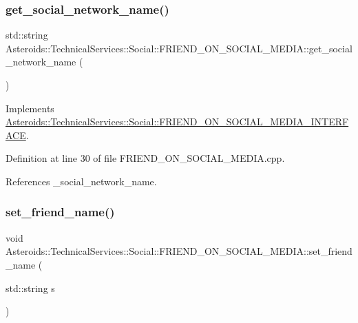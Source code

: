 \subsubsection{\texorpdfstring{get\+\_\+social\+\_\+network\+\_\+name()}{get\_social\_network\_name()}}
{\footnotesize\ttfamily std\+::string Asteroids\+::\+Technical\+Services\+::\+Social\+::\+F\+R\+I\+E\+N\+D\+\_\+\+O\+N\+\_\+\+S\+O\+C\+I\+A\+L\+\_\+\+M\+E\+D\+I\+A\+::get\+\_\+social\+\_\+network\+\_\+name (\begin{DoxyParamCaption}{ }\end{DoxyParamCaption})\hspace{0.3cm}{\ttfamily [virtual]}}



Implements \hyperlink{classAsteroids_1_1TechnicalServices_1_1Social_1_1FRIEND__ON__SOCIAL__MEDIA__INTERFACE_a695c43020081a6ca5d4537762b63006b}{Asteroids\+::\+Technical\+Services\+::\+Social\+::\+F\+R\+I\+E\+N\+D\+\_\+\+O\+N\+\_\+\+S\+O\+C\+I\+A\+L\+\_\+\+M\+E\+D\+I\+A\+\_\+\+I\+N\+T\+E\+R\+F\+A\+CE}.



Definition at line 30 of file F\+R\+I\+E\+N\+D\+\_\+\+O\+N\+\_\+\+S\+O\+C\+I\+A\+L\+\_\+\+M\+E\+D\+I\+A.\+cpp.



References \+\_\+social\+\_\+network\+\_\+name.

\mbox{\label{classAsteroids_1_1TechnicalServices_1_1Social_1_1FRIEND__ON__SOCIAL__MEDIA_a1902b65f552f6b7c32315278d0de3d94}} 
\subsubsection{\texorpdfstring{set\+\_\+friend\+\_\+name()}{set\_friend\_name()}}
{\footnotesize\ttfamily void Asteroids\+::\+Technical\+Services\+::\+Social\+::\+F\+R\+I\+E\+N\+D\+\_\+\+O\+N\+\_\+\+S\+O\+C\+I\+A\+L\+\_\+\+M\+E\+D\+I\+A\+::set\+\_\+friend\+\_\+name (\begin{DoxyParamCaption}\item[{std\+::string}]{s }\end{DoxyParamCaption})\hspace{0.3cm}{\ttfamily [virtual]}}



